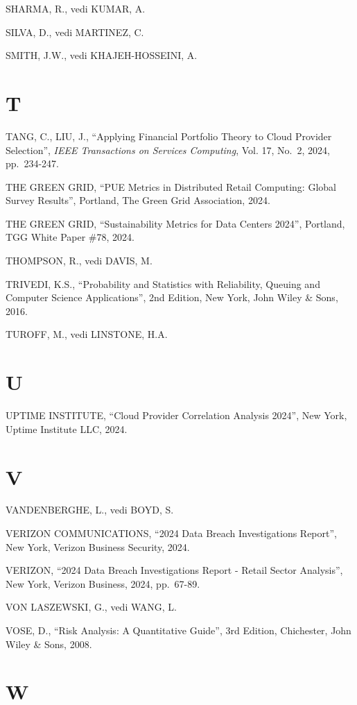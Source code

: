 \documentclass[12pt,a4paper,oneside]{book}
\numberwithin{figure}{chapter} %
\numberwithin{table}{chapter}  %
\begin{document}
SHARMA, R., vedi KUMAR, A.

SILVA, D., vedi MARTINEZ, C.

SMITH, J.W., vedi KHAJEH-HOSSEINI, A.

\section{T}\label{t-1}

TANG, C., LIU, J., ``Applying Financial Portfolio Theory to Cloud
Provider Selection'', \emph{IEEE Transactions on Services Computing},
Vol. 17, No.~2, 2024, pp.~234-247.

THE GREEN GRID, ``PUE Metrics in Distributed Retail Computing: Global
Survey Results'', Portland, The Green Grid Association, 2024.

THE GREEN GRID, ``Sustainability Metrics for Data Centers 2024'',
Portland, TGG White Paper \#78, 2024.

THOMPSON, R., vedi DAVIS, M.

TRIVEDI, K.S., ``Probability and Statistics with Reliability, Queuing
and Computer Science Applications'', 2nd Edition, New York, John Wiley
\& Sons, 2016.

TUROFF, M., vedi LINSTONE, H.A.

\section{U}\label{u-1}

UPTIME INSTITUTE, ``Cloud Provider Correlation Analysis 2024'', New
York, Uptime Institute LLC, 2024.

\section{V}\label{v-1}

VANDENBERGHE, L., vedi BOYD, S.

VERIZON COMMUNICATIONS, ``2024 Data Breach Investigations Report'', New
York, Verizon Business Security, 2024.

VERIZON, ``2024 Data Breach Investigations Report - Retail Sector
Analysis'', New York, Verizon Business, 2024, pp.~67-89.

VON LASZEWSKI, G., vedi WANG, L.

VOSE, D., ``Risk Analysis: A Quantitative Guide'', 3rd Edition,
Chichester, John Wiley \& Sons, 2008.

\section{W}\label{w-1}
\end{document}
